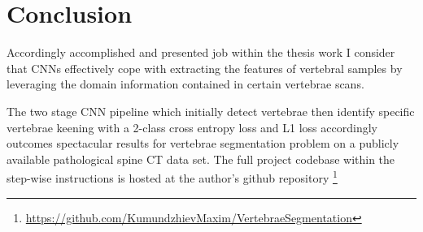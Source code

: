 \chapter{Conclusion}
\label{ch:conclusion}
Accordingly  accomplished and presented job within the thesis work I consider that CNNs effectively cope with extracting the features of vertebral samples by leveraging the domain information contained in certain vertebrae scans.

The two stage CNN pipeline which initially detect vertebrae then identify specific vertebrae keening with a 2-class cross entropy loss and L1 loss accordingly outcomes spectacular results for vertebrae segmentation problem on a publicly available pathological spine CT data set. The full project codebase within the step-wise instructions is hosted at the author's github repository \footnote{ \url{https://github.com/KumundzhievMaxim/VertebraeSegmentation}}